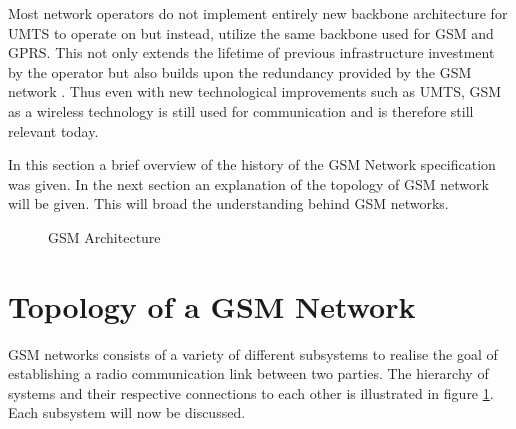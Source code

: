 Most network operators do not implement entirely new backbone architecture for UMTS to operate on but instead, utilize the same backbone used for GSM and GPRS. This not only extends the lifetime of previous infrastructure investment by the operator but also builds upon the redundancy provided by the GSM network \cite{GSMArchitectureProtocolsServices}. Thus even with new technological improvements such as UMTS, GSM as a wireless technology is still used for communication and is therefore still relevant today.

In this section a brief overview of the history of the GSM Network specification was given. In the next section an explanation of the topology of GSM network will be given. This will broad the understanding behind GSM networks.

\begin{figure}[hptb]
	\begin{centering}
		
		\caption{GSM Architecture}
		\label{fig:GSMArchitecture}
	\end{centering}
\end{figure}

\section{Topology of a GSM Network}
GSM networks consists of a variety of different subsystems to realise the goal of establishing a radio communication link between two parties. The hierarchy of systems and their respective connections to each other is illustrated in figure \ref{fig:GSMArchitecture}. Each subsystem will now be discussed.

